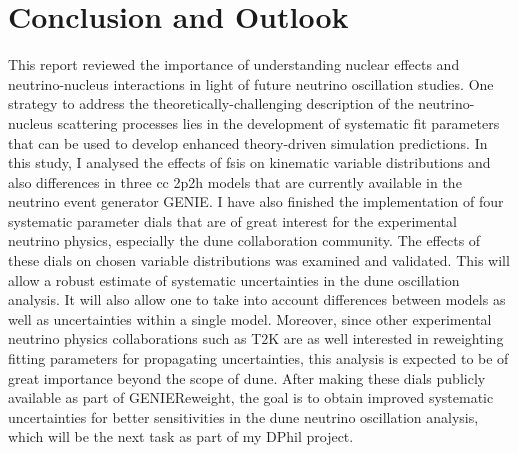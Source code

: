 \section{Conclusion and Outlook} \label{conclusion_syst} \vspace{-3mm}
This report reviewed the importance of understanding nuclear effects and neutrino-nucleus interactions in light of future neutrino oscillation studies. One strategy to address the theoretically-challenging description of the neutrino-nucleus scattering processes lies in the development of systematic fit parameters that can be used to develop enhanced theory-driven simulation predictions. In this study, I analysed the effects of \acrshort{fsi}s on kinematic variable distributions and also differences in three \acrshort{cc} \acrshort{2p2h} models that are currently available in the neutrino event generator GENIE. I have also finished the implementation of four systematic parameter dials that are of great interest for the experimental neutrino physics, especially the \acrshort{dune} collaboration community. %
The effects of these dials on chosen variable distributions was examined and validated. This will allow a robust estimate of systematic uncertainties in the \acrshort{dune} oscillation analysis. It will also allow one to take into account differences between models as well as uncertainties within a single model. Moreover, since other experimental neutrino physics collaborations such as T$2$K are as well interested in reweighting fitting parameters for propagating uncertainties, this analysis is expected to be of great importance beyond the scope of \acrshort{dune}. After making these dials publicly available as part of GENIEReweight, the goal is to obtain improved systematic uncertainties for better sensitivities in the \acrshort{dune} neutrino oscillation analysis, which will be the next task as part of my DPhil project.
